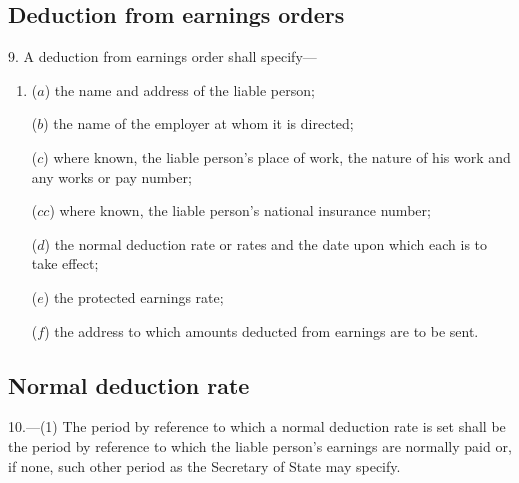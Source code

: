 \documentclass[12pt,a4paper]{article}
\begin{document}
\subsection[9. Deduction from earnings orders]{Deduction from earnings orders}

9.  A deduction from earnings order shall specify—
\begin{enumerate}\item[]
($a$) the name and address of the liable person;

($b$) the name of the employer at whom it is directed;

($c$) where known, the liable person’s place of work, the nature of his work and any works or pay number;

($cc$) where known, the liable person’s national insurance number;

%

($d$) the normal deduction rate or rates and the date upon which each is to take effect;

($e$) the protected earnings rate;

($f$) the address to which amounts deducted from earnings are to be sent.
\end{enumerate}


\subsection[10. Normal deduction rate]{Normal deduction rate}

10.—(1) The period by reference to which 
a normal deduction rate  %
is set shall be the period by reference to which the liable person’s earnings are normally paid or, if none, such other period as the Secretary of State may specify.
\end{document}
